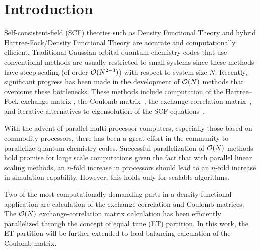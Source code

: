 \commentoutA{\documentclass[prl,aps,twocolumn,twocolumngrid,superbib]{revtex4}}
\begin{document}

\section{Introduction}
\label{sec:intro}
Self-consistent-field (SCF) theories such as Density Functional Theory
and hybrid Hartree-Fock/Density Functional Theory are accurate and
computationally efficient. Traditional Gaussian-orbital quantum
chemistry codes that use conventional methods\cite{ASzabo89} are
usually restricted to small systems since these methods have steep
scaling (of order ${\cal O}(N^{2-3})$) with respect to system size
$N$.  Recently, significant progress has been made in the development
of ${\cal O}(N)$ methods that overcome these bottlenecks.  These
methods include computation of the Hartree--Fock exchange matrix
\cite{ESchwegler96,ESchwegler97,ESchwegler98A,ESchwegler99,ESchwegler00,CTymczak04b},
the Coulomb
matrix~\cite{CWhite94B,CWhite96A,MChallacombe96,MChallacombe96B,MStrain96,JPerezjorda97,MChallacombe97,CTymczak04a},
the exchange-correlation
matrix~\cite{CTymczak04a,Jorda95,RStratmann96,CGuerra98,MChallacombe00A},
and iterative alternatives to eigensolution of the SCF
equations~\cite{XLi93,MDaw93,SQiu94,EHernandez96,ADaniels97,APalser98,MChallacombe99,ANiklasson02A,ANiklasson03}.

With the advent of parallel multi-processor computers, especially
those based on commodity processors, there has been a great effort in
the community to parallelize quantum chemistry
codes\cite{Harrison_94v45,Guerra_95,Stephan_98v108,Sosa_98v19,Furlani_00v128,Sosa_00v26,RKendall00,Yoshihiro_01v346,Baker_02v23,JBaker04}.
Successful parallelization of ${\cal O}(N)$ methods hold promise for
large scale computations given the fact that with parallel linear
scaling methods, an $n$-fold increase in processors should lead to an
$n$-fold increase in simulation capability. However, this holds only
for scalable algorithms.

Two of the most computationally demanding parts in a density
functional application are calculation of the exchange-correlation and
Coulomb matrices. The ${\cal O}(N)$ exchange-correlation matrix
calculation has been efficiently parallelized through the concept of
equal time (ET) partition\cite{CGan03}.  In this work, the ET
partition will be further extended to load balancing calculation of
the Coulomb matrix.
\end{document}
